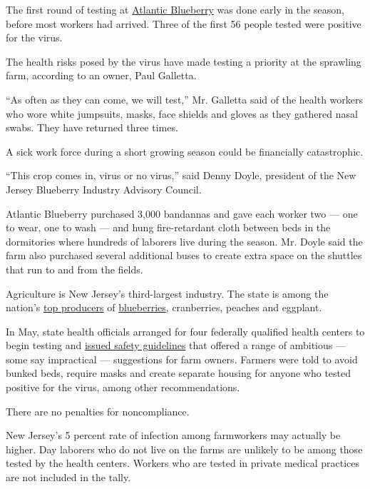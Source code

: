 The first round of testing at
\href{https://www.atlanticblueberry.com/history}{Atlantic Blueberry} was
done early in the season, before most workers had arrived. Three of the
first 56 people tested were positive for the virus.

The health risks posed by the virus have made testing a priority at the
sprawling farm, according to an owner, Paul Galletta.

``As often as they can come, we will test,'' Mr. Galletta said of the
health workers who wore white jumpsuits, masks, face shields and gloves
as they gathered nasal swabs. They have returned three times.

A sick work force during a short growing season could be financially
catastrophic.

``This crop comes in, virus or no virus,'' said Denny Doyle, president
of the New Jersey Blueberry Industry Advisory Council.

Atlantic Blueberry purchased 3,000 bandannas and gave each worker two
--- one to wear, one to wash --- and hung fire-retardant cloth between
beds in the dormitories where hundreds of laborers live during the
season. Mr. Doyle said the farm also purchased several additional buses
to create extra space on the shuttles that run to and from the fields.

Agriculture is New Jersey's third-largest industry. The state is among
the nation's
\href{https://www.nj.gov/agriculture/pdf/2018Annual\%20ReportFINAL.pdf}{top
producers} of
\href{https://www.nj.gov/agriculture/news/press/2019/approved/press190701.html\#:~:text=Blueberries\%20were\%20the\%20No.,on\%209\%2C000\%20acres\%20last\%20year.}{blueberries},
cranberries, peaches and eggplant.

In May, state health officials arranged for four federally qualified
health centers to begin testing and
\href{https://nj.gov/health/cd/documents/topics/NCOV/COVID_MigrantFarmWorkerGuidance_5.20.2020.pdf}{issued
safety guidelines} that offered a range of ambitious --- some say
impractical --- suggestions for farm owners. Farmers were told to avoid
bunked beds, require masks and create separate housing for anyone who
tested positive for the virus, among other recommendations.

There are no penalties for noncompliance.

New Jersey's 5 percent rate of infection among farmworkers may actually
be higher. Day laborers who do not live on the farms are unlikely to be
among those tested by the health centers. Workers who are tested in
private medical practices are not included in the tally.

